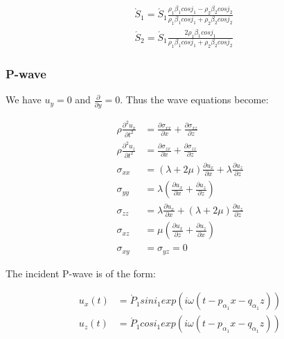 \documentclass[methods.tex]{subfiles}
\begin{document}
\begin{equation}
\begin{split}
& \grave S_1 = \acute S_1 \frac{\rho_1 \beta_1 cos j_1 - \rho_2 \beta_2 cos j_2}{\rho_1 \beta_1 cos j_1 + \rho_2 \beta_2 cos j_2} \\
& \acute S_2 = \acute S_1 \frac{2 \rho_1 \beta_1 cos j_1}{\rho_1 \beta_1 cos j_1 + \rho_2 \beta_2 cos j_2}
\end{split}
\end{equation}

\subsubsection{P-wave}

We have $u_y = 0$ and $\frac{\partial}{\partial y} = 0$. Thus the wave equations become:

\begin{equation}
\begin{split}
\rho \frac{\partial ^2 u_x}{\partial t^2} & = \frac{\partial \sigma_{xx}}{\partial x} + \frac{\partial \sigma_{xz}}{\partial z} \\
\rho \frac{\partial ^2 u_z}{\partial t^2} & = \frac{\partial \sigma_{zx}}{\partial x} + \frac{\partial \sigma_{zz}}{\partial z} \\
\sigma_{xx} & = (\lambda + 2 \mu) \frac{\partial u_x}{\partial x} + \lambda \frac{\partial u_z}{\partial z} \\
\sigma_{yy} & = \lambda (\frac{\partial u_x}{\partial x} + \frac{\partial u_z}{\partial z}) \\
\sigma_{zz} & = \lambda \frac{\partial u_x}{\partial x} + (\lambda + 2 \mu) \frac{\partial u_z}{\partial z} \\
\sigma_{xz} & = \mu (\frac{\partial u_x}{\partial z} + \frac{\partial u_z}{\partial x}) \\
\sigma_{xy} & = \sigma_{yz} = 0
\end{split}
\end{equation}

The incident P-wave is of the form:

\begin{equation}
\begin{split}
u_x (t) & = \acute P_1 sin i_1 exp (i \omega (t - p_{\alpha_1} x - q_{\alpha_1} z)) \\
u_z (t) & = \acute P_1 cos i_1 exp (i \omega (t - p_{\alpha_1} x - q_{\alpha_1} z))
\end{split}
\end{equation}
\end{document}
